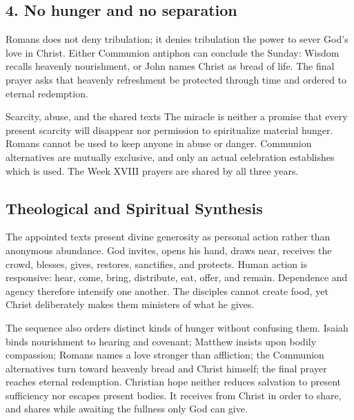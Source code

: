 \subsection*{4. No hunger and no separation\enspace{}}
Romans does not deny tribulation; it denies tribulation the power to sever God's love in Christ. Either Communion antiphon can conclude the Sunday: Wisdom recalls heavenly nourishment, or John names Christ as bread of life. The final prayer asks that heavenly refreshment be protected through time and ordered to eternal redemption.

\begin{studybox}{Scarcity, abuse, and the shared texts}
The miracle is neither a promise that every present scarcity will disappear nor permission to spiritualize material hunger. Romans cannot be used to keep anyone in abuse or danger. Communion alternatives are mutually exclusive, and only an actual celebration establishes which is used. The Week XVIII prayers are shared by all three years.
\end{studybox}

\clearpage
\subsection*{Theological and Spiritual Synthesis}
The appointed texts present divine generosity as personal action rather than anonymous abundance. God invites, opens his hand, draws near, receives the crowd, blesses, gives, restores, sanctifies, and protects. Human action is responsive: hear, come, bring, distribute, eat, offer, and remain. Dependence and agency therefore intensify one another. The disciples cannot create food, yet Christ deliberately makes them ministers of what he gives.

The sequence also orders distinct kinds of hunger without confusing them. Isaiah binds nourishment to hearing and covenant; Matthew insists upon bodily compassion; Romans names a love stronger than affliction; the Communion alternatives turn toward heavenly bread and Christ himself; the final prayer reaches eternal redemption. Christian hope neither reduces salvation to present sufficiency nor escapes present bodies. It receives from Christ in order to share, and shares while awaiting the fullness only God can give.


